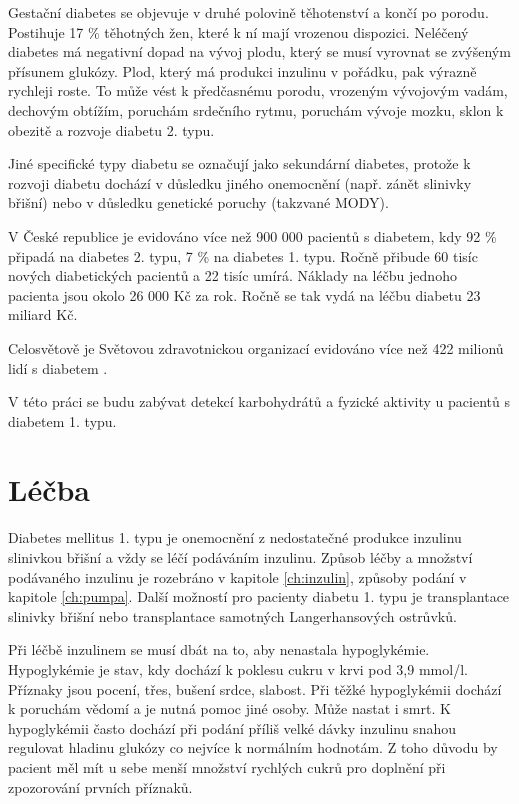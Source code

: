 Gestační diabetes se objevuje v druhé polovině těhotenství a končí po porodu. Postihuje 17 \% těhotných žen, které k ní mají vrozenou dispozici. Neléčený diabetes má negativní dopad na vývoj plodu, který se musí vyrovnat se zvýšeným přísunem glukózy. Plod, který má produkci inzulinu v pořádku, pak výrazně rychleji roste. To může vést k předčasnému porodu, vrozeným vývojovým vadám, dechovým obtížím, poruchám srdečního rytmu, poruchám vývoje mozku, sklon k obezitě a rozvoje diabetu 2. typu.

Jiné specifické typy diabetu se označují jako sekundární diabetes, protože k rozvoji diabetu dochází v důsledku jiného onemocnění (např. zánět slinivky břišní) nebo v důsledku genetické poruchy (takzvané MODY).

V České republice je evidováno více než 900 000 pacientů s diabetem, kdy 92 \% připadá na diabetes 2. typu, 7 \% na diabetes 1. typu. Ročně přibude 60 tisíc nových diabetických pacientů a 22 tisíc umírá. Náklady na léčbu jednoho pacienta jsou okolo 26 000 Kč za rok. Ročně se tak vydá na léčbu diabetu 23 miliard Kč. \cite{Diabetes.Psottova,Diabetes.TaiN} %

Celosvětově je Světovou zdravotnickou organizací evidováno více než 422 milionů lidí s diabetem \cite{WHO}.

V této práci se budu zabývat detekcí karbohydrátů a fyzické aktivity u pacientů s diabetem 1. typu.


\section{Léčba}

Diabetes mellitus 1. typu je onemocnění z nedostatečné produkce inzulinu slinivkou břišní a vždy se léčí podáváním inzulinu. Způsob léčby a množství podávaného inzulinu je rozebráno v kapitole \ref{ch:inzulin}, způsoby podání v kapitole \ref{ch:pumpa}. Další možností pro pacienty diabetu 1. typu je transplantace slinivky břišní nebo transplantace samotných Langerhansových ostrůvků.

Při léčbě inzulinem se musí dbát na to, aby nenastala hypoglykémie. Hypoglykémie je stav, kdy dochází k poklesu cukru v krvi pod 3,9 mmol/l. Příznaky jsou pocení, třes, bušení srdce, slabost. Při těžké hypoglykémii dochází k poruchám vědomí a je nutná pomoc jiné osoby. Může nastat i smrt. K hypoglykémii často dochází při podání příliš velké dávky inzulinu snahou regulovat hladinu glukózy co nejvíce k normálním hodnotám. Z toho důvodu by pacient měl mít u sebe menší množství rychlých cukrů pro doplnění při zpozorování prvních příznaků.

